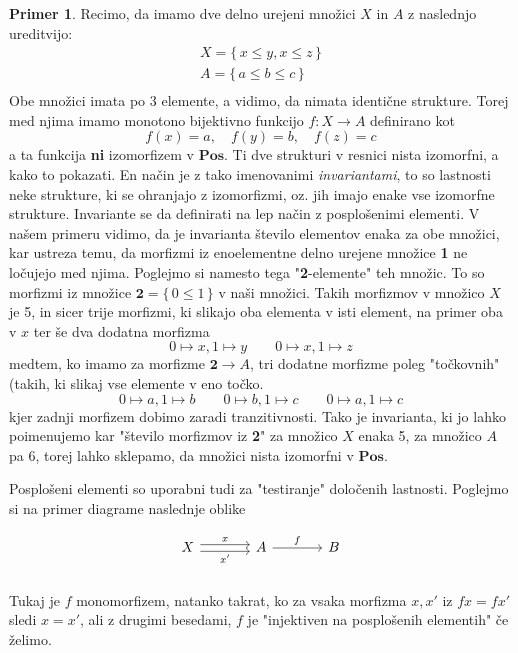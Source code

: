 \documentclass[12pt,a4paper]{book}
\theoremstyle{definition}
\theoremstyle{plain}
\theoremstyle{definition}
\newtheorem{primer}{Primer}[section]
\theoremstyle{remark}
\newcommand{\cat}[1]{\textbf{#1}}
\renewcommand{\set}[1]{\{\,#1\,\}}
\begin{document}
\begin{primer}
Recimo, da imamo dve delno urejeni množici $X$ in $A$ z naslednjo ureditvijo:
\begin{align*}
X = \set{x \leq y, x \leq z} \\
A = \set{a \leq b \leq c} \\
\end{align*}
Obe množici imata po 3 elemente, a vidimo, da nimata identične strukture. Torej med njima imamo monotono bijektivno funkcijo $f : X \to A$ definirano kot
$$f(x) = a, \quad f(y) = b, \quad f(z) = c$$
a ta funkcija \textbf{ni} izomorfizem v $\cat{Pos}$. Ti dve strukturi v resnici nista izomorfni, a kako to pokazati. En način je z tako imenovanimi \textit{invariantami}, to so lastnosti neke strukture, ki se ohranjajo z izomorfizmi, oz. jih imajo enake vse izomorfne strukture. Invariante se da definirati na lep način z posplošenimi elementi. V našem primeru vidimo, da je invarianta število elementov enaka za obe množici, kar ustreza temu, da morfizmi iz enoelementne delno urejene množice \textbf{1} ne ločujejo med njima. Poglejmo si namesto tega "\textbf{2}-elemente" teh množic. To so morfizmi iz množice $\textbf{2} = \set{0 \leq 1}$ v naši množici. Takih morfizmov v množico $X$ je 5, in sicer trije morfizmi, ki slikajo oba elementa v isti element, na primer oba v $x$ ter še dva dodatna morfizma
$$0 \mapsto x, 1 \mapsto y \qquad 0 \mapsto x, 1 \mapsto z$$
medtem, ko imamo za morfizme $\textbf{2} \to A$, tri dodatne morfizme poleg "točkovnih" (takih, ki slikaj vse elemente v eno točko.
$$0 \mapsto a, 1 \mapsto b \qquad 0 \mapsto b, 1 \mapsto c \qquad 0 \mapsto a, 1 \mapsto c$$
kjer zadnji morfizem dobimo zaradi tranzitivnosti.
Tako je invarianta, ki jo lahko poimenujemo kar "število morfizmov iz \textbf{2}" za množico $X$ enaka 5, za množico $A$ pa 6, torej lahko sklepamo, da množici nista izomorfni v $\cat{Pos}$.
\end{primer}

Posplošeni elementi so uporabni tudi za "testiranje" določenih lastnosti. Poglejmo si na primer diagrame naslednje oblike

$$\begin{tikzcd}[column sep=large]
X \ar[r, shift left, "x"] \ar[r, shift right, "x'"'] & A \ar[r, "f"] & B \\
\end{tikzcd}$$
Tukaj je $f$ monomorfizem, natanko takrat, ko za vsaka morfizma $x, x'$ iz $fx = fx'$ sledi $x = x'$, ali z drugimi besedami, $f$ je "injektiven na posplošenih elementih" če želimo.
\end{document}
